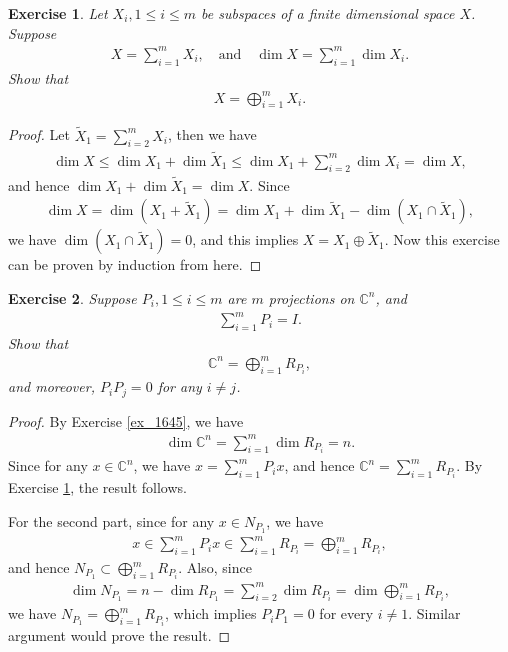 \documentclass[11pt]{book}
\newtheorem{exercise}{Exercise}[section]
\theoremstyle{definition}
\numberwithin{equation}{chapter}
\begin{document}
\medskip

\begin{exercise}\label{ex_1646}
Let $X_i, 1 \leq i \leq m$ be subspaces of a finite dimensional space $X$. Suppose 
\begin{align*}
    X = \sum^m_{i=1} X_i, \quad \text{and} \quad \dim  X = \sum^m_{i=1} \dim  X_i.
\end{align*}
Show that 
\begin{align*}
    X = \bigoplus^m_{i=1} X_i.
\end{align*}
\end{exercise}
\begin{proof}
Let $\widetilde{X}_1 = \sum^m_{i=2} X_i$, then we have
\begin{align*}
    \dim  X \leq \dim  X_1 + \dim  \widetilde{X}_1 \leq \dim  X_1 + \sum^m_{i=2} \dim  X_i = \dim  X,
\end{align*}
and hence $\dim  X_1 + \dim  \widetilde{X}_1 = \dim  X$. Since
\begin{align*}
    \dim  X = \dim  \left(X_1 + \widetilde{X}_1\right) = \dim  X_1 + \dim  \widetilde{X}_1 - \dim  \left(X_1 \cap \widetilde{X}_1\right),
\end{align*}
we have $\dim  \left(X_1 \cap \widetilde{X}_1\right) = 0$, and this implies $X = X_1 \oplus \widetilde{X}_1$. Now this exercise can be proven by induction from here.
\end{proof}

\medskip

\begin{exercise}
Suppose $P_i, 1 \leq i \leq m$ are $m$ projections on $\mathbb{C}^n$, and
\begin{align*}
    \sum^m_{i=1} P_i = I.
\end{align*}
Show that 
\begin{align*}
    \mathbb{C}^n = \bigoplus^m_{i=1} R_{P_i},
\end{align*}
and moreover, $P_i P_j = 0$ for any $i \neq j$.
\end{exercise}
\begin{proof}
By Exercise \ref{ex_1645}, we have
\begin{align*}
    \dim \mathbb{C}^n = \sum^m_{i=1} \dim R_{P_i} = n.
\end{align*}
Since for any $x \in \mathbb{C}^n$, we have $x = \sum^m_{i=1} P_ix$, and hence $\mathbb{C}^n = \sum^m_{i=1} R_{P_i}$. By Exercise \ref{ex_1646}, the result follows. 

For the second part, since for any $x \in N_{P_1}$, we have
\begin{align*}
    x \in \sum^m_{i=1} P_i x \in  \sum^m_{i=1} R_{P_i} = \bigoplus^m_{i=1} R_{P_i},
\end{align*}
and hence $N_{P_1} \subset \bigoplus^m_{i=1} R_{P_i}$. Also, since
\begin{align*}
    \dim N_{P_1} = n - \dim R_{P_1} = \sum^m_{i=2} \dim R_{P_i} = \dim \bigoplus^m_{i=1} R_{P_i},
\end{align*}
we have $N_{P_1} = \bigoplus^m_{i=1} R_{P_i}$, which implies $P_iP_1 = 0$ for every $i \neq 1$. Similar argument would prove the result. 
\end{proof}
\end{document}
